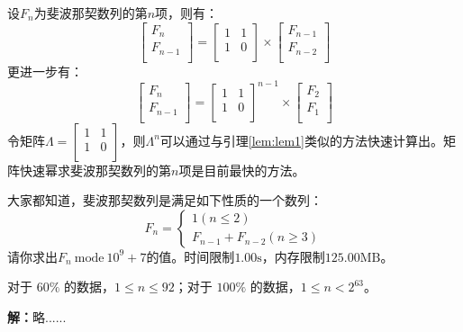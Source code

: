 \begin{proposition}[矩阵快速幂]
    设$F_n$为斐波那契数列的第$n$项，则有：
    \begin{equation}
        \left[ \begin{array}{c}
            F_n\\
            F_{n-1}\\
        \end{array} \right] =\left[ \begin{matrix}
            1&		1\\
            1&		0\\
        \end{matrix} \right] \times \left[ \begin{array}{c}
            F_{n-1}\\
            F_{n-2}\\
        \end{array} \right] 
    \end{equation}
    更进一步有：
    \begin{equation}
        \left[ \begin{array}{c}
            F_n\\
            F_{n-1}\\
        \end{array} \right] =\left[ \begin{matrix}
            1&		1\\
            1&		0\\
        \end{matrix} \right] ^{n-1}\times \left[ \begin{array}{c}
            F_2\\
            F_1\\
        \end{array} \right] 
    \end{equation}
    令矩阵$\varLambda =\left[ \begin{matrix}
        1&		1\\
        1&		0\\
    \end{matrix} \right] $，则$\varLambda ^n$可以通过与引理\ref{lem:lem1}类似的方法快速计算出。矩阵快速幂求斐波那契数列的第$n$项是目前最快的方法。
\end{proposition}



\begin{example}[P1962~斐波那契数列(洛谷)]
    大家都知道，斐波那契数列是满足如下性质的一个数列：
    \begin{equation}
        F_n=\left\{\begin{array}{r}
            1(n \leq 2) \\
            F_{n-1}+F_{n-2}(n \geq 3)
            \end{array}\right.
    \end{equation}
    请你求出$F_n~\mathrm{mode}~10^9 + 7$的值。时间限制$\mathrm{1.00s}$，内存限制$\mathrm{125.00MB}$。
    \par 对于 $60\%$ 的数据，$1\le n \le 92$；对于 $100\%$ 的数据，$1\le n < 2^{63}$。
    \par \textbf{解：}略......
\end{example}

